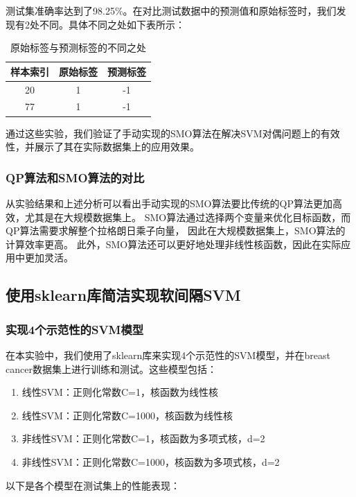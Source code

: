 \documentclass[12pt]{article}
\begin{document}
测试集准确率达到了98.25\%。在对比测试数据中的预测值和原始标签时，我们发现有2处不同。具体不同之处如下表所示：

\begin{table}[h]
  \centering
  \begin{tabular}{ccc}
    \toprule
    样本索引 & 原始标签 & 预测标签 \\
    \midrule
    20   & 1    & -1   \\
    77   & 1    & -1   \\
    \bottomrule
  \end{tabular}
  \caption{原始标签与预测标签的不同之处}
\end{table}

通过这些实验，我们验证了手动实现的SMO算法在解决SVM对偶问题上的有效性，并展示了其在实际数据集上的应用效果。


\subsubsection{QP算法和SMO算法的对比}
从实验结果和上述分析可以看出手动实现的SMO算法要比传统的QP算法更加高效，尤其是在大规模数据集上。
SMO算法通过选择两个变量来优化目标函数，而QP算法需要求解整个拉格朗日乘子向量，
因此在大规模数据集上，SMO算法的计算效率更高。
此外，SMO算法还可以更好地处理非线性核函数，因此在实际应用中更加灵活。


\subsection{使用sklearn库简洁实现软间隔SVM}

\subsubsection{实现4个示范性的SVM模型}

在本实验中，我们使用了sklearn库来实现4个示范性的SVM模型，并在breast cancer数据集上进行训练和测试。这些模型包括：

\begin{enumerate}
  \item 线性SVM：正则化常数C=1，核函数为线性核
  \item 线性SVM：正则化常数C=1000，核函数为线性核
  \item 非线性SVM：正则化常数C=1，核函数为多项式核，d=2
  \item 非线性SVM：正则化常数C=1000，核函数为多项式核，d=2
\end{enumerate}

以下是各个模型在测试集上的性能表现：
\end{document}
